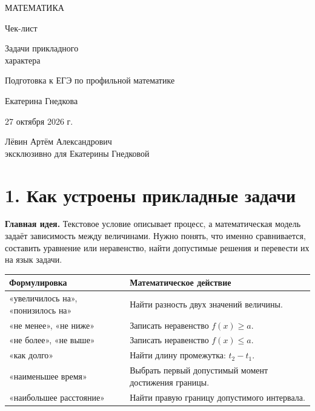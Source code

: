 \documentclass[a4paper,12pt]{article}
\newcommand{\idea}[1]{\textcolor{darkaccent}{\textbf{#1}}}
\newcommand{\sectionline}{\par\vspace{-1mm}{\color{accent}\hrule height .45pt}\vspace{4mm}}
\newcommand{\sect}[2]{\section*{\textcolor{darkaccent}{#1. #2}}\sectionline}
\begin{document}
\thispagestyle{empty}
\begin{center}
\vspace*{24mm}
{\Large\textcolor{darkaccent}{МАТЕМАТИКА}}\par
\vspace{21mm}
{\fontsize{26}{32}\selectfont Чек-лист}\par
\vspace{18mm}
{\fontsize{21}{27}\selectfont\textcolor{accent}{Задачи прикладного\\ характера}}\par
\vspace{15mm}
{\large Подготовка к ЕГЭ по профильной математике}\par
\vfill
{\large Екатерина Гнедкова}\par
\vspace{14mm}
{\large 27 октября 2026 г.}\par
\vspace{18mm}
{\small Лёвин Артём Александрович\\[2mm] эксклюзивно для Екатерины Гнедковой}\par
\vspace{23mm}
\end{center}
\clearpage

\sect{1}{Как устроены прикладные задачи}
\idea{Главная идея.} Текстовое условие описывает процесс, а математическая модель задаёт зависимость между величинами. Нужно понять, что именно сравнивается, составить уравнение или неравенство, найти допустимые решения и перевести их на язык задачи.

\begin{tabularx}{\linewidth}{@{}p{.33\linewidth}X@{}}
\toprule
\textcolor{darkaccent}{Формулировка} & \textcolor{darkaccent}{Математическое действие}\\
\midrule
«увеличилось на», «понизилось на» & Найти разность двух значений величины.\\
«не менее», «не ниже» & Записать неравенство $f(x)\ge a$.\\
«не более», «не выше» & Записать неравенство $f(x)\le a$.\\
«как долго» & Найти длину промежутка: $t_2-t_1$.\\
«наименьшее время» & Выбрать первый допустимый момент достижения границы.\\
«наибольшее расстояние» & Найти правую границу допустимого интервала.\\
\bottomrule
\end{tabularx}
\end{document}
